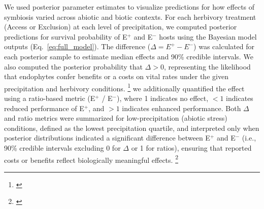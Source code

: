 \documentclass[12pt]{article}\usepackage[]{graphicx}\usepackage[dvipsnames]{xcolor}
\newcommand{\tom}[2]{{\color{red}{#1}}\footnote{\textit{\color{red}{#2}}}}
\begin{document}
We used posterior parameter estimates to visualize predictions for how effects of symbiosis varied across abiotic and biotic contexts. 
For each herbivory treatment (Access or Exclusion) at each level of precipitation, we computed posterior predictions for survival probability of E$^+$ and E$^-$ hosts using the Bayesian model outputs (Eq.~\ref{eq:full_model}).
The difference ($\Delta = E^+ - E^-$) was calculated for each posterior sample to estimate median effects and 90\% credible intervals. 
We also computed the posterior probability that $\Delta > 0$, representing the likelihood that endophytes confer benefits or a costs on vital rates under the given precipitation and herbivory conditions.
\tom{When endophytes conferred a measurable cost,}{Unclear why you only did this in the case of costs} we additionally quantified the effect using a ratio-based metric (E$^+$ / E$^-$), where 1 indicates no effect, $<1$ indicates reduced performance of E$^+$, and $>1$ indicates enhanced performance.  
Both $\Delta$ and ratio metrics were summarized for low-precipitation (abiotic stress) conditions, defined as the lowest precipitation quartile, and interpreted only when posterior distributions indicated a significant difference between E$^+$ and E$^-$ (i.e., 90\% credible intervals excluding 0 for $\Delta$ or 1 for ratios), ensuring that reported costs or benefits reflect biologically meaningful effects.
\tom{}{I don't understand why you use both Delta and the ratio. Don't they provide the same information? Added later: it also seems like you only focus on the delta values in the Results.}
\end{document}
